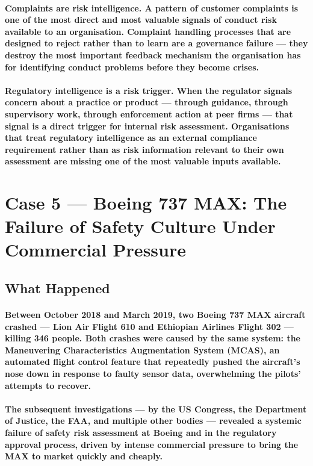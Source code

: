 \paragraph{\textbf{Complaints are risk intelligence}. A pattern of customer complaints is one of the most direct and most valuable signals of conduct risk available to an organisation. Complaint handling processes that are designed to reject rather than to learn are a governance failure — they destroy the most important feedback mechanism the organisation has for identifying conduct problems before they become crises.}
\paragraph{\textbf{Regulatory intelligence is a risk trigger}. When the regulator signals concern about a practice or product — through guidance, through supervisory work, through enforcement action at peer firms — that signal is a direct trigger for internal risk assessment. Organisations that treat regulatory intelligence as an external compliance requirement rather than as risk information relevant to their own assessment are missing one of the most valuable inputs available.}

\section{Case 5 — Boeing 737 MAX: The Failure of Safety Culture Under Commercial Pressure}

\subsection{What Happened}
\paragraph{Between October 2018 and March 2019, two Boeing 737 MAX aircraft crashed — Lion Air Flight 610 and Ethiopian Airlines Flight 302 — killing 346 people. Both crashes were caused by the same system: the Maneuvering Characteristics Augmentation System (MCAS), an automated flight control feature that repeatedly pushed the aircraft's nose down in response to faulty sensor data, overwhelming the pilots' attempts to recover.}
\paragraph{The subsequent investigations — by the US Congress, the Department of Justice, the FAA, and multiple other bodies — revealed a systemic failure of safety risk assessment at Boeing and in the regulatory approval process, driven by intense commercial pressure to bring the MAX to market quickly and cheaply.}

